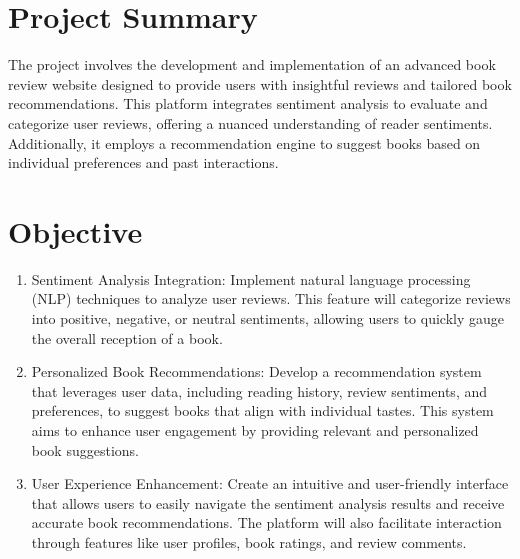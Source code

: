 \section{Project Summary}
The project involves the development and implementation of an advanced book review website designed to provide users with insightful reviews and tailored book recommendations. This platform integrates sentiment analysis to evaluate and categorize user reviews, offering a nuanced understanding of reader sentiments. Additionally, it employs a recommendation engine to suggest books based on individual preferences and past interactions.
\section{Objective}
\begin{enumerate}
	\item Sentiment Analysis Integration: Implement natural language processing (NLP) techniques to analyze user reviews. This feature will categorize reviews into positive, negative, or neutral sentiments, allowing users to quickly gauge the overall reception of a book.
	\item Personalized Book Recommendations: Develop a recommendation system that leverages user data, including reading history, review sentiments, and preferences, to suggest books that align with individual tastes. This system aims to enhance user engagement by providing relevant and personalized book suggestions.
	\item User Experience Enhancement: Create an intuitive and user-friendly interface that allows users to easily navigate the sentiment analysis results and receive accurate book recommendations. The platform will also facilitate interaction through features like user profiles, book ratings, and review comments.
\end{enumerate} 
